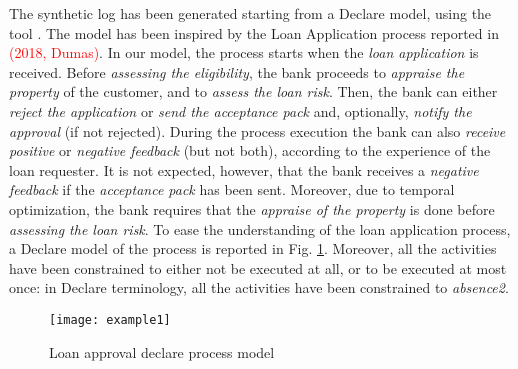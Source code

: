 The synthetic log has been generated starting from a Declare model, using the tool \cite{2020-Loreti}. The model has been inspired by the Loan Application process reported in \textcolor{red}{(2018, Dumas)}.  In our model, the process starts when the \emph{loan application} is received. Before \emph{assessing the eligibility}, the bank proceeds to \emph{appraise the property} of the customer, and to \emph{assess the loan risk}. Then, the bank can either \emph{reject the application} or \emph{send the acceptance pack} and, optionally, \emph{notify the approval} (if not rejected). During the process execution the bank can also \emph{receive positive} or \emph{negative feedback} (but not both), according to the experience of the loan requester. It is not expected, however, that the bank receives a \emph{negative feedback} if the \emph{acceptance pack} has been sent. Moreover, due to temporal optimization, the bank requires that the \emph{appraise of the property} is done before \emph{assessing the loan risk}.
To ease the understanding of the loan application process, a Declare model of the process is reported in Fig. \ref{fig:ex}. Moreover, all the activities have been constrained to either not be executed at all, or to be executed at most once: in Declare terminology, all the activities have been constrained to \emph{absence2}.

\begin{figure}[t]
\centering
\texttt{[image: example1]}
\caption{Loan approval declare process model }
\label{fig:ex}
\end{figure}

